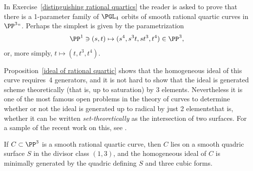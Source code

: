 \begin{example}
In Exercise~\ref{distinguishing rational quartics} the reader 
is asked to
prove that there is a 1\hbox{-}parameter family of 
$\PGL_4$ orbits of smooth rational quartic curves in $\PP^3` `$. 
Perhaps the simplest is given by the parametrization 
$$
\PP^1 \ni (s,t) \mapsto (s^4, s^3t, st^3, t^4)\in \PP^3,
$$
or, more simply, $t\mapsto(t, t^3, t^4)$. 

Proposition~\ref{ideal of rational quartic} shows that the homogeneous
ideal of this curve requires~4 generators, and it is not hard to show
that the ideal is generated scheme theoretically (that is, up to saturation) by 3 elements. Nevertheless it is
one of the most famous open problems in the theory of curves to determine whether or not the ideal
is generated up to radical by just 2 elements\emdash that is, whether it
can be written 
\emph{set-theoretically} 
%
as the intersection of two surfaces. For a sample of the recent
work on this, see \cite{MR3356940}. 
\end{example}

\begin{proposition}\label{ideal of rational quartic}
If $C\subset \PP^3$ is a smooth rational quartic curve, then $C$ lies on a smooth quadric
surface $S$ in the divisor class $(1,3)$, and the homogeneous ideal of $C$ is minimally
generated by the quadric defining $S$ and three cubic forms.
\end{proposition}

